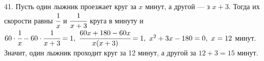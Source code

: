 41. Пусть один лыжник проезжает круг за $x$ минут, а другой --- з $x+3.$ Тогда их скорости равны $\cfrac{1}{x}$ и $\cfrac{1}{x+3}$ круга в минуту и $60\cdot\cfrac{1}{x}-60\cdot\cfrac{1}{x+3}=1,\ \cfrac{60x+180-60x}{x(x+3)}=1,\ x^2+3x-180=0,\ x=12$ минут. Значит, один лыжник проходит круг за 12 минут, а другой за $12+3=15$ минут.\\
